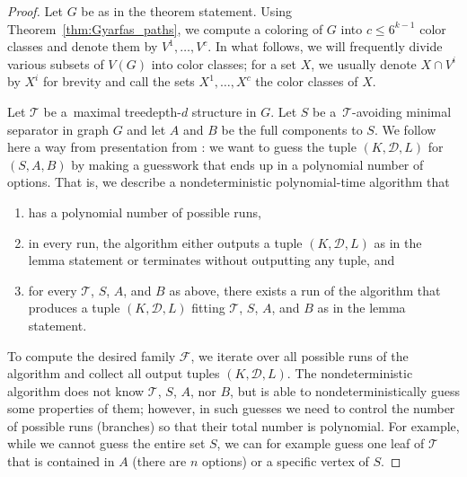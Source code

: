 \documentclass[11pt,a4paper]{article}
\theoremstyle{definition}
\def\T{\mathcal{T}}
\begin{document}
\begin{proof}
Let $G$ be as in the theorem statement. 
Using Theorem~\ref{thm:Gyarfas_paths}, we compute a coloring of $G$ into $c \leq 6^{k-1}$ color
classes and denote them by $V^1, \ldots, V^c$. 
In what follows, we will frequently divide various subsets of $V(G)$ into color classes;
for a set $X$, we usually denote $X \cap V^i$ by $X^i$ for brevity
and call the sets $X^1,\ldots,X^c$ the color classes of $X$. 

Let $\T$ be a~maximal treedepth-$d$ structure in $G$. Let $S$ be a~$\T$-avoiding minimal separator in graph $G$ and let $A$ and $B$ be the full components to $S$. 
We follow here a way from presentation from \cite{Tara,DBLP:conf/soda/ChudnovskyMPPR24}: we want to guess
the tuple $(K,\mathcal{D},L)$ for $(S,A,B)$ by making a guesswork that
ends up in a polynomial number of options. 
That is, we describe a nondeterministic polynomial-time algorithm that
\begin{enumerate}
\item has a polynomial number of possible runs, 
\item in every run, the algorithm either outputs a tuple $(K, \mathcal{D}, L)$ as in the lemma statement
or terminates without outputting any tuple, and
\item for every $\T$, $S$, $A$, and $B$ as above, there exists a run of the 
algorithm that produces a tuple $(K,\mathcal{D},L)$ fitting $\T$, $S$, $A$, and $B$
as in the lemma statement. 
\end{enumerate}
To compute the desired family $\mathcal{F}$, we iterate over all possible runs of the algorithm
and collect all output tuples $(K,\mathcal{D},L)$.
The nondeterministic algorithm does not know $\T$, $S$, $A$, nor $B$, but is able to 
nondeterministically guess some properties of them; however, in such guesses we need to
control the number of possible runs (branches) so that their total number is polynomial. 
For example, while we cannot guess the entire set $S$, we can for example guess 
one leaf of $\T$ that is contained in $A$ (there are $n$ options) or a specific vertex
of $S$. 


\end{proof}
\end{document}
